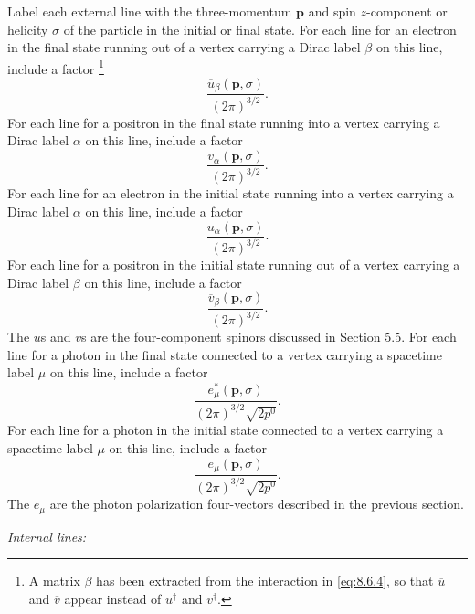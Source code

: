 Label each external line with the three-momentum $\mathbf p$ and spin
$z$-component or helicity $\sigma$ of the particle in the initial or final
state. For each line for an electron in the final state running out of a
vertex carrying a Dirac label $\beta$ on this line, include a factor
\footnote{A matrix $\beta$ has been extracted from the interaction in \eqref{eq:8.6.4},
so that $\overline u$ and $\overline v$ appear instead of $u^\dagger$ and
$v^\dagger$.}
\begin{equation}
\frac{\overline u_\beta(\mathbf p,\sigma)}{(2\pi)^{3/2}}.
\tag{8.6.5}\label{eq:8.6.5}
\end{equation}
For each line for a positron in the final state running into a vertex carrying
a Dirac label $\alpha$ on this line, include a factor
\begin{equation}
\frac{v_\alpha(\mathbf p,\sigma)}{(2\pi)^{3/2}}.
\tag{8.6.6}\label{eq:8.6.6}
\end{equation}
For each line for an electron in the initial state running into a vertex
carrying a Dirac label $\alpha$ on this line, include a factor
\begin{equation}
\frac{u_\alpha(\mathbf p,\sigma)}{(2\pi)^{3/2}}.
\tag{8.6.7}\label{eq:8.6.7}
\end{equation}
For each line for a positron in the initial state running out of a vertex
carrying a Dirac label $\beta$ on this line, include a factor
\begin{equation}
\frac{\overline v_\beta(\mathbf p,\sigma)}{(2\pi)^{3/2}}.
\tag{8.6.8}\label{eq:8.6.8}
\end{equation}
The $u$s and $v$s are the four-component spinors discussed in Section 5.5.
For each line for a photon in the final state connected to a vertex carrying a
spacetime label $\mu$ on this line, include a factor
\begin{equation}
\frac{e^*_\mu(\mathbf p,\sigma)}{(2\pi)^{3/2}\sqrt{2p^0}}.
\tag{8.6.9}\label{eq:8.6.9}
\end{equation}
For each line for a photon in the initial state connected to a vertex carrying
a spacetime label $\mu$ on this line, include a factor
\begin{equation}
\frac{e_\mu(\mathbf p,\sigma)}{(2\pi)^{3/2}\sqrt{2p^0}}.
\tag{8.6.10}\label{eq:8.6.10}
\end{equation}
The $e_\mu$ are the photon polarization four-vectors described in the previous
section.

\begin{center}
\textit{Internal lines:}
\end{center}

